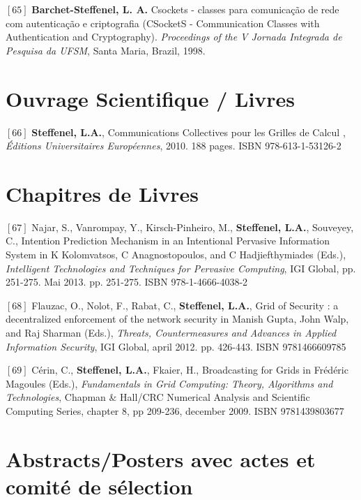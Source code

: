 \documentclass[final,twoside]{hdr} %
\begin{document}
\vspace{1em} \noindent $[65]$
\textbf{Barchet-Steffenel, L. A.} {Csockets - classes para comunicação de rede com autenticação e criptografia} (CSocketS - Communication Classes with Authentication and Cryptography). {\em Proceedings of the V Jornada Integrada de Pesquisa da UFSM}, Santa Maria, Brazil, 1998.

\section*{Ouvrage Scientifique / Livres}

\noindent $[66]$
\textbf{Steffenel, L.A.}, {Communications Collectives pour les Grilles de Calcul} , {\em Éditions Universitaires Européennes}, 2010. 188 pages. ISBN 978-613-1-53126-2

\section*{Chapitres de Livres}

\noindent $[67]$
Najar, S., Vanrompay, Y., Kirsch-Pinheiro, M., \textbf{Steffenel, L.A.}, Souveyey, C., {Intention Prediction Mechanism in an Intentional Pervasive Information System} in K Kolomvatsos, C Anagnostopoulos, and C Hadjiefthymiades (Eds.), {\em Intelligent Technologies and Techniques for Pervasive Computing}, IGI Global, pp. 251-275. Mai 2013. pp. 251-275. ISBN 978-1-4666-4038-2

\vspace{1em} \noindent $[68]$
Flauzac, O., Nolot, F., Rabat, C., \textbf{Steffenel, L.A.}, {Grid of Security : a decentralized enforcement of the network security} in Manish Gupta, John Walp, and Raj Sharman (Eds.), {\em Threats, Countermeasures and Advances in Applied Information Security}, IGI Global, april 2012. pp. 426-443. ISBN 9781466609785

\vspace{1em} \noindent $[69]$
Cérin, C., \textbf{Steffenel, L.A.}, Fkaier, H., {Broadcasting for Grids} in Frédéric Magoules (Eds.), {\em Fundamentals in Grid Computing: Theory, Algorithms and Technologies}, Chapman \& Hall/CRC Numerical Analysis and Scientific Computing Series, chapter 8, pp 209-236, december 2009. ISBN 9781439803677

\section*{Abstracts/Posters avec actes et comité de sélection}
\end{document}
